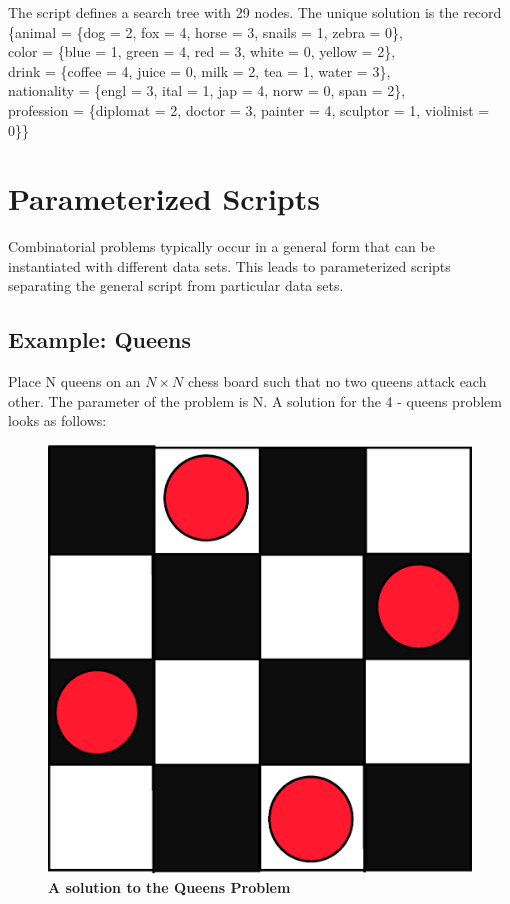 \documentclass[a4paper]{scrartcl}
\begin{document}
\par
The script defines a search tree with 29 nodes. 
The unique solution is the record\\
\{animal = \{dog = 2, fox = 4, horse = 3, snails = 1, zebra = 0\},\\ 
 color = \{blue = 1, green = 4, red = 3, white = 0, yellow = 2\},\\
 drink = \{coffee = 4, juice = 0, milk = 2, tea = 1, water = 3\},\\ 
 nationality = \{engl = 3, ital = 1, jap = 4, norw = 0, span = 2\},\\ 
 profession = \{diplomat = 2, doctor = 3, painter = 4, sculptor = 1, violinist = 0\}\}




\newpage
\section{Parameterized Scripts}
Combinatorial problems typically occur in a general form that can 
be instantiated with different data sets. This leads to parameterized 
scripts separating the general script from particular data sets.

\subsection{Example: Queens}
Place N queens on an $ N \times N $ chess board such that no two queens 
attack each other. The parameter of the problem is N. A solution for the 
4 - queens problem looks as follows:
\begin{figure}[htpb]
\centerline{\includegraphics*[scale=0.3]{figs2/queens-4.eps}}
\caption{{\bf A solution to the Queens Problem}}
\label{figure 11}
\end{figure}
\end{document}
